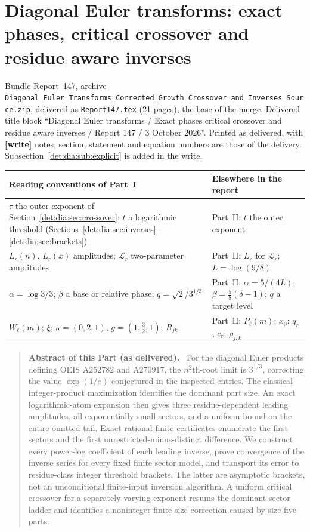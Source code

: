 \documentclass[11pt,letterpaper]{article}
\numberwithin{equation}{section}
\theoremstyle{definition}\newtheorem{definition}[theorem]{Definition}
\theoremstyle{remark}\newtheorem{remark}[theorem]{Remark}
\newcommand{\file}[1]{\nolinkurl{#1}}
\newenvironment{partabstract}{\begin{quote}\small\noindent\textbf{Abstract of this Part (as delivered).}\ }{\end{quote}}
\newcommand{\partsource}[1]{\par\noindent\begin{minipage}{\textwidth}\small #1\end{minipage}\par\medskip}
\begin{document}
\part{Diagonal Euler transforms: exact phases, critical crossover and residue aware inverses}\label{det:dia:part}
\partsource{Bundle Report~147, archive \file{Diagonal_Euler_Transforms_Corrected_Growth_Crossover_and_Inverses_Source.zip}, delivered as \file{Report147.tex} (21 pages), the base of the merge. Delivered title block ``Diagonal Euler transforms / Exact phases critical crossover and residue aware inverses / Report 147 / 3 October 2026''. Printed as delivered, with \textbf{[write]} notes; section, statement and equation numbers are those of the delivery. Subsection~\ref{det:dia:sub:explicit} is added in the write.}
\begin{center}
\small
\begin{tabular}{@{}>{\raggedright\arraybackslash}p{} >{\raggedright\arraybackslash}p{}@{}}
\toprule
Reading conventions of Part~I & Elsewhere in the report\\
\midrule
$\tau$ the outer exponent of Section~\ref{det:dia:sec:crossover}; $t$ a logarithmic threshold (Sections~\ref{det:dia:sec:inverses}--\ref{det:dia:sec:brackets}) & Part~II: $t$ the outer exponent\\
$L_r(n)$, $L_r(x)$ amplitudes; $\mathcal L_r$ two-parameter amplitudes & Part~II: $L_r$ for $\mathcal L_r$; $L=\log(9/8)$\\
$\alpha=\log3/3$; $\beta$ a base or relative phase; $q=\sqrt2/3^{1/3}$ & Part~II: $\alpha=5/(4L)$; $\beta=\frac58(\delta-1)$; $q$ a target level\\
$W_\ell(m)$; $\xi$; $\kappa=(0,2,1)$, $g=(1,\frac32,1)$; $R_{jk}$ & Part~II: $P_\ell(m)$; $x_0$; $q_r$, $c_r$; $\rho_{j,k}$\\
\bottomrule
\end{tabular}
\end{center}
\begin{partabstract}
For the diagonal Euler products defining OEIS A252782 and A270917, the
$n^2$th-root limit is $3^{1/3}$, correcting the value $\exp(1/e)$ conjectured
in the inspected entries. The classical integer-product maximization
identifies the dominant part size. An exact logarithmic-atom expansion
then gives three residue-dependent leading amplitudes, all exponentially
small sectors, and a uniform bound on the entire omitted tail. Exact
rational finite certificates enumerate the first sectors and the first
unrestricted-minus-distinct difference. We construct every power-log
coefficient of each leading inverse, prove convergence of the inverse
series for every fixed finite sector model, and transport its error to
residue-class integer threshold brackets. The latter are asymptotic
brackets, not an unconditional finite-input inversion algorithm. A uniform critical crossover for a separately varying exponent resums the dominant sector ladder and identifies a noninteger finite-size correction caused by size-five parts.
\end{partabstract}
\end{document}
